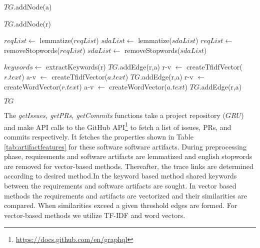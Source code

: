\begin{breakablealgorithm}
\begin{algorithmic}[1]
 \label{algl:c}
\State $TG$.addNode(a)
\EndFor \label{algl:c}

 \label{algl:c}
\State $TG$.addNode(r)
\EndFor \label{algl:c}


\State $reqList \leftarrow$ lemmatize($reqList$)
\State $sdaList \leftarrow$ lemmatize($sdaList$)
\State $reqList \leftarrow$ removeStopwords($reqList$)
\State $sdaList \leftarrow$ removeStopwords($sdaList$)
\EndIf


    \State $keywords \leftarrow$ extractKeywords(r)
        \State $TG$.addEdge(r,a)
    \EndIf
\EndCase
{}
    \State r-v $\leftarrow$ createTfidfVector($r.text$)
    \State a-v $\leftarrow$ createTfidfVector($a.text$)
      \State $TG$.addEdge(r,a)
    \EndIf
\EndCase
{}
    \State r-v $\leftarrow$ createWordVector($r.text$)
    \State a-v $\leftarrow$ createWordVector($a.text$)
        \State $TG$.addEdge(r,a)
    \EndIf
\EndCase
\EndSwitch
\EndFor
\EndFor

\Return $TG$
\end{algorithmic}

\end{breakablealgorithm}

The \textit{getIssues, getPRs, getCommits} functions take a project repository  ($GRU$) and make API calls to the GitHub API\footnote{\url{https://docs.github.com/en/graphql}} to fetch a list of issues, PRs, and commits respectively. 
It fetches the properties shown in Table \ref{tab:artifactfeatures} for these software software artifacts. 
During preprocessing phase, requirements and software artifacts are lemmatized and english stopwords are removed for vector-based methods. 
Thereafter, the trace links are determined according to desired method.In the keyword based method shared keywords between the requirements and software artifacts are sought. In vector based methods the requirements and artifacts are vectorized and their similarities are compared. When similarities exceed a given threshold edges are formed. For vector-based methods we utilize TF-IDF and word vectors.